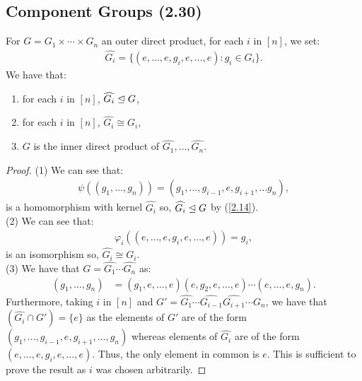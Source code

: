 \newpage

\subsection{Component Groups (2.30)} \label{2.30}

For $G = G_1 \times \cdots \times G_n$ an outer direct product, 
for each $i$ in $[n]$, we set: \begin{align*}
    \widehat{G_i} = \{(e, \ldots, e, g_i, e, \ldots, e) : g_i \in G_i\}.
\end{align*} We have that: \begin{enumerate}
    \item for each $i$ in $[n]$, $\widehat{G_i} \trianglelefteq G$,
    \item for each $i$ in $[n]$, $\widehat{G_i} \cong G_i$,
    \item $G$ is the inner direct product of $\widehat{G_1}, \ldots, \widehat{G_n}$.
\end{enumerate}

\begin{proof}
    (1) We can see that: \begin{align*}
        \psi((g_1, \ldots, g_n)) = (g_1, \ldots, g_{i - 1}, e, g_{i + 1}, \ldots g_n),
    \end{align*} is a homomorphism with kernel $\widehat{G_i}$ so, $\widehat{G_i} \trianglelefteq G$
    by (\ref{2.14}).
    \\[\baselineskip]
    (2) We can see that: \begin{align*}
        \varphi_i((e, \ldots, e, g_i, e, \ldots, e)) = g_i,
    \end{align*} is an isomorphism so, $\widehat{G_i} \cong G_i$.
    \\[\baselineskip]
    (3) We have that $G = \widehat{G_1} \cdots \widehat{G_n}$ as:
    \begin{align*}
        (g_1, \ldots, g_n)
        &= (g_1, e, \ldots, e)(e, g_2, e, \ldots, e)
        \cdots (e, \ldots, e, g_n).
    \end{align*} Furthermore, taking $i$ in $[n]$ and $G' = \widehat{G_1} \cdots 
    \widehat{G_{i - 1}} \widehat{G_{i + 1}} \cdots G_n$, we have that \linebreak 
    $(\widehat{G_i} \cap G') = \{e\}$ as the elements of $G'$ are of the form
    $(g_1, \ldots, g_{i - 1}, e, g_{i + 1}, \ldots, g_n)$ whereas elements
    of $\widehat{G_i}$ are of the form $(e, \ldots, e, g_i, e, \ldots, e)$.
    Thus, the only element in common is $e$. This is sufficient to prove the result
    as $i$ was chosen arbitrarily.
\end{proof}

